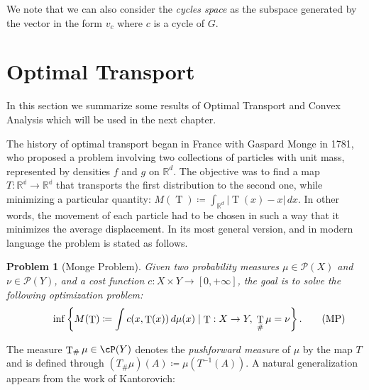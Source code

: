 \documentclass[11pt,a4paper,oneside,openany]{book}
\DeclareMathOperator{\T}{T}
\DeclareMathOperator{\MP}{MP}
\newtheorem{problem}{Problem}
\numberwithin{definition}{section}
\numberwithin{theorem}{section}
\numberwithin{problem}{section}
\begin{document}
We note that we can  also consider the \emph{cycles space} as the subspace generated by the vector in the form $v_c$ where $c$ is a cycle of $G$.


\section{Optimal Transport}
In this section we summarize some results of Optimal Transport and Convex Analysis which will be used in the next chapter.


The history of optimal transport began in France with Gaspard Monge in 1781, who proposed a problem involving two collections of particles with unit mass, represented by densities $f$ and $g$ on $\mathbb{R}^d$. The objective was to find a map $T:\mathbb{R^d} \rightarrow \mathbb{R^d}$ that transports the first distribution to the second one, while minimizing a particular quantity: $M(\T) \coloneqq \int_{\mathbb{R}^d} |\T(x) - x| \, dx$. In other words, the movement of each particle had to be chosen in such a way that it minimizes the average displacement. In its most general version, and in modern language the problem is stated as follows.
\begin{problem}[Monge Problem]\label{Monge Problem}
Given two probability measures $\mu \in \mathcal{P}(X)$ and $\nu \in \mathcal{P}(Y)$, and a cost function $c:X\times Y \rightarrow [0,+\infty]$, the goal is to solve the following optimization problem:
\begin{equation}
\hspace{1cm} \inf\left\{M(\T) \coloneqq \int c(x,\T(x)) \, d\mu(x) \mid \T:X \to Y, \;\T_{\#}\mu = \nu\right\}. \tag{$\MP$}
\end{equation}
\end{problem}
The measure $\T_{\#}\mu \in \cP(Y)$ denotes the \emph{pushforward measure} of $\mu$ by the map $T$ and is defined through $(T_{\#}\mu)(A) \coloneqq \mu(T^{-1}(A))$.
A natural generalization appears from the work of Kantorovich:
\end{document}
